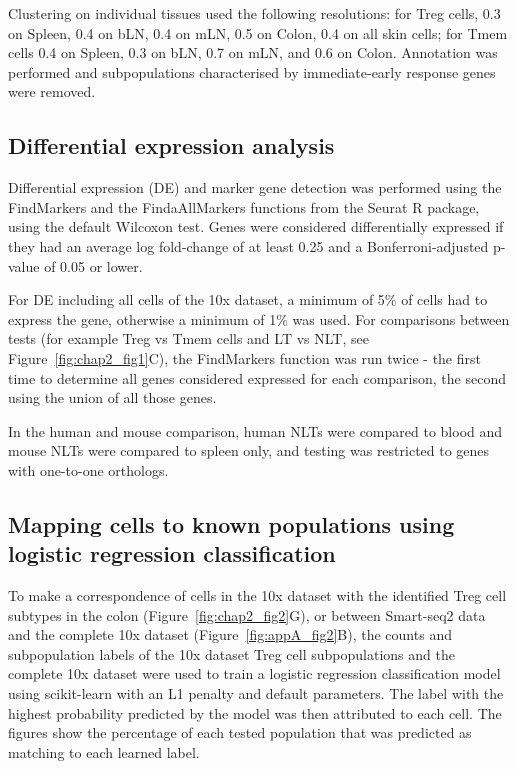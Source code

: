 Clustering on individual tissues used the following resolutions: for Treg cells, 0.3 on Spleen, 0.4 on bLN, 0.4 on mLN, 0.5 on Colon, 0.4 on all skin cells; for Tmem cells 0.4 on Spleen, 0.3 on bLN, 0.7 on mLN, and 0.6 on Colon. Annotation was performed and subpopulations characterised by immediate-early response genes were removed.

\subsection{Differential expression analysis}
Differential expression (DE) and marker gene detection was performed using the FindMarkers and the FindaAllMarkers functions from the Seurat R package, using the default Wilcoxon test. Genes were considered differentially expressed if they had an average log fold-change of at least 0.25 and a Bonferroni-adjusted p-value of 0.05 or lower. 

For DE including all cells of the 10x dataset, a minimum of 5${\%}$ of cells had to express the gene, otherwise a minimum of 1${\%}$ was used. For comparisons between tests (for example Treg vs Tmem cells and LT vs NLT, see Figure~\ref{fig:chap2_fig1}C), the FindMarkers function was run twice - the first time to determine all genes considered expressed for each comparison, the second using the union of all those genes.

In the human and mouse comparison, human NLTs were compared to blood and mouse NLTs were compared to spleen only, and testing was restricted to genes with one-to-one orthologs.

\subsection{Mapping cells to known populations using logistic regression classification}
To make a correspondence of cells in the 10x dataset with the identified Treg cell subtypes in the colon (Figure~\ref{fig:chap2_fig2}G), or between Smart-seq2 data and the complete 10x dataset (Figure~\ref{fig:appA_fig2}B), the counts and subpopulation labels of the 10x dataset Treg cell subpopulations and the complete 10x dataset were used to train a logistic regression classification model using scikit-learn with an L1 penalty and default parameters. The label with the highest probability predicted by the model was then attributed to each cell. The figures show the percentage of each tested population that was predicted as matching to each learned label.


